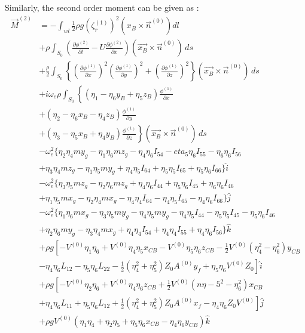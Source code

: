 Similarly, the second order moment can be given as :
\begin{align}
    \vec{M}^{(2)} &= -\int_{wl}\frac{1}{2}\rho g (\zeta_r^{(1)})^2 (x_B\times \vec{n}^{(0)}) dl \\ \nonumber
    &+\rho\int_{S_0}\left(\frac{\partial \phi^{(2)}}{\partial t} - U\frac{\partial \phi^{(2)}}{\partial x}\right)
    (\vec{x_B}\times\vec{n}^{(0)})\,ds \\ \nonumber
    &+\frac{\rho}{2}\int_{S_0}\left\{\left(\frac{\partial \phi^{(1)}}{\partial x}\right)^2
    \left(\frac{\partial \phi^{(1)}}{\partial y}\right)^2 + \left(\frac{\partial \phi^{(1)}}{\partial z}\right)^2
    \right\}(\vec{x_B}\times\vec{n}^{(0)})\,ds \\ \nonumber
    &+i\omega_e\rho\int_{S_0}
    \left\{(\eta_1-\eta_6y_B+\eta_5z_B)\frac{\phi^{(1)}}{\partial x} \right. \\ \nonumber 
    &\left. + (\eta_2-\eta_6x_B-\eta_4z_B)\frac{\phi^{(1)}}{\partial y}\right. \\ \nonumber
    &\left. + (\eta_3-\eta_5x_B+\eta_4y_B)\frac{\phi^{(1)}}{\partial z}\right\}
    (\vec{x_B}\times \vec{n}^{(0)})\,ds \\ \nonumber
    &-\omega_e^2\{\eta_2\eta_4my_g-\eta_1\eta_6mz_g-\eta_4\eta_6I_{54}
    -eta_5\eta_6I_{55}-\eta_6\eta_6I_{56} \\ \nonumber
    &+\eta_3\eta_4mz_g-\eta_1\eta_5my_g+\eta_4\eta_5I_{64}+\eta_5\eta_5 I_{65}
    +\eta_5\eta_6 I_{66} \}\hat{i} \\ \nonumber
    &-\omega_e^2\{\eta_3\eta_5mz_g-\eta_2\eta_6mz_g+\eta_4\eta_6I_{44}+\eta_5\eta_6 I_{45}
    +\eta_6\eta_6I_{46}\\ \nonumber
    &+\eta_1\eta_5mx_g-\eta_2\eta_4mx_g-\eta_4\eta_4 I_{64}-\eta_4\eta_5 I_{65}-\eta_4\eta_6 I_{66}\} \hat{j} \\ \nonumber
    &-\omega_e^2\{\eta_1\eta_6mx_g-\eta_3\eta_5my_g-\eta_4\eta_5my_g-\eta_4\eta_5 I_{44}
    -\eta_5\eta_5 I_{45}-\eta_5\eta_6 I_{46} \\ \nonumber
    &+\eta_2\eta_6my_g-\eta_3\eta_4mx_g+\eta_4\eta_4 I_{54}+\eta_4\eta_4 I_{55}
    +\eta_4\eta_6 I_{56} \}\hat{k} \\ \nonumber
    &+\rho g \left[-V^{(0)}\eta_1\eta_6+V^{(0)}\eta_4\eta_5x_{CB}-V^{(0)}\eta_5\eta_6z_{CB}
    -\frac{1}{2}V^{(0)}(\eta_4^2-\eta_6^2)y_{CB} \right. \\ \nonumber
    &\left.-\eta_4\eta_6L_{12}-\eta_5\eta_6L_{22}-\frac{1}{2}(\eta_4^2+\eta_5^2)Z_0A^{(0)}y_f 
    +\eta_5\eta_6V^{(0)}Z_0\right]\hat{i} \\ \nonumber
    &+\rho g \left[-V^{(0)}\eta_2\eta_6+V^{(0)}\eta_4\eta_6z_{CB}+\frac{1}{2}V^{(0)} 
    (n\eta-5^2-\eta_6^2)x_{CB} \right. \\ \nonumber
    &\left. +\eta_4\eta_6 L_{11}+\eta_5\eta_6L_{12}+\frac{1}{2}(\eta_4^2+\eta_5^2)Z_0A^{(0)}x_f
    -\eta_4\eta_6 Z_0V^{(0)}\right]\hat{j} \\ \nonumber
    &+\rho g V^{(0)}(\eta_1\eta_4+\eta_2\eta_5+\eta_5\eta_6x_{CB}-\eta_4\eta_6y_{CB})\hat{k}
\end{align}
